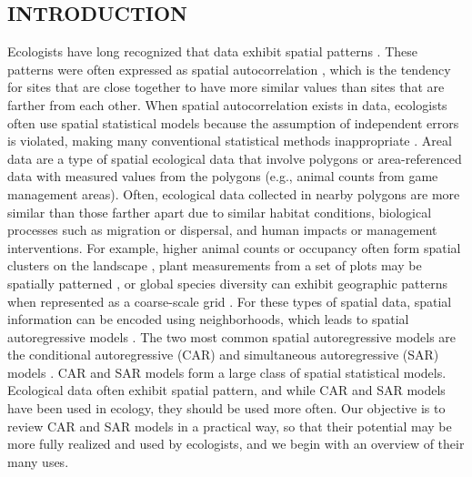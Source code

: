 \documentclass[11pt, titlepage]{article}\usepackage[]{graphicx}\usepackage[]{color}
\begin{document}

\newpage
\begin{spacing}{1.9}
\begin{flushleft}
\setlength{\parindent}{1cm}



\section*{INTRODUCTION}

Ecologists have long recognized that data exhibit spatial patterns \citep{Watt:patt:1947}. These patterns were often expressed as spatial autocorrelation \citep{Soka:Oden:spat:1978}, which is the tendency for sites that are close together to have more similar values than sites that are farther from each other.  When spatial autocorrelation exists in data, ecologists often use spatial statistical models because the assumption of independent errors is violated, making many conventional statistical methods inappropriate \citep{Clif:Ord:spat:1981,Lege:spat:1993}.  Areal data are a type of spatial ecological data that involve polygons or area-referenced data with measured values from the polygons (e.g., animal counts from game management areas). Often, ecological data collected in nearby polygons are more similar than those farther apart due to similar habitat conditions, biological processes such as migration or dispersal, and human impacts or management interventions. For example, higher animal counts or occupancy often form spatial clusters on the landscape \citep{Thog:Saue:Knut:hier:2004,Pole:Pond:Scha:Brow:Ray:John:occu:2014,Brom:John:Altw:Conq:spat:2014}, plant measurements from a set of plots may be spatially patterned \citep{Agar:Sila:Gelf:Dewa:Mick:trop:2005,Bull:Burk:eval:2005,Huan:Grac:Hu:Rowl:Meng:spat:2013}, or  global species diversity can exhibit geographic patterns when represented as a coarse-scale grid \citep{Togn:Kelt:anal:2004,Pede:Oste:Sand:Sven:macr:2014}. For these types of spatial data, spatial information can be encoded using neighborhoods, which leads to spatial autoregressive models \citep{Lich:Simo:Shri:Fran:spat:2002}. The two most common spatial autoregressive models are the conditional autoregressive (CAR) and simultaneous autoregressive (SAR) models \citep{Hain:spat:1990,Cres:stat:1993}. CAR and SAR models form a large class of spatial statistical models.  Ecological data often exhibit spatial pattern, and while CAR and SAR models have been used in ecology, they should be used more often. Our objective is to review CAR and SAR models in a practical way, so that their potential may be more fully realized and used by ecologists, and we begin with an overview of their many uses.


\end{flushleft}
\end{spacing}
\end{document}
